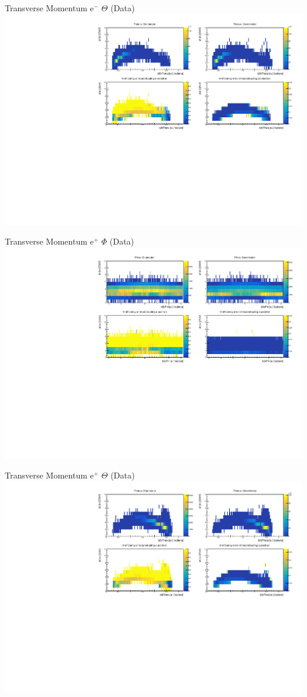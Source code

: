 \documentclass[10pt]{beamer}
\begin{document}
\begin{frame}{Transverse Momentum $\textrm{e}^-$ $\Theta$ (Data)}
	\centering
	\includegraphics[width=\textwidth]{Momentum/tMThetaem_Data}
\end{frame}

\begin{frame}{Transverse Momentum $\textrm{e}^+$ $\Phi$ (Data)}
	\centering
	\includegraphics[width=\textwidth]{Momentum/tMPhiep_Data}
\end{frame}


\begin{frame}{Transverse Momentum $\textrm{e}^+$ $\Theta$ (Data)}
	\centering
	\includegraphics[width=\textwidth]{Momentum/tMThetaep_Data}
\end{frame}
\end{document}
